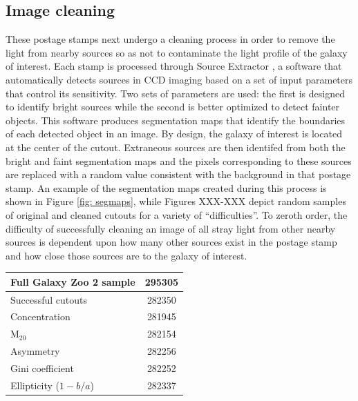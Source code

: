 \subsection{Image cleaning}
These postage stamps next undergo a cleaning process in order to remove the light from nearby sources so as not to contaminate the light profile of the galaxy of interest. Each stamp is processed through Source Extractor \citep[ver. 2.8.6;][]{sextractor}, a software that automatically detects sources in CCD imaging based on a set of input parameters that control its sensitivity. Two sets of parameters are used: the first is designed to identify bright sources while the second is better optimized to detect fainter objects. This software produces segmentation maps that identify the boundaries of each detected object in an image. By design, the galaxy of interest is located at the center of the cutout. Extraneous sources are then identifed from both the bright and faint segmentation maps and the pixels corresponding to these sources are replaced with a random value consistent with the background in that postage stamp.  An example of the segmentation maps created during this process is shown in Figure \ref{fig: segmaps}, while Figures XXX-XXX depict random samples of original and cleaned cutouts for a variety of ``difficulties''. To zeroth order, the difficulty of successfully cleaning an image of all stray light from other nearby sources is dependent upon how many other sources exist in the postage stamp and how close those sources are to the galaxy of interest. 


\begin{table}
	\begin{tabular}{|l|c|}
		\hline
		Full Galaxy Zoo 2 sample 	& 295305 \\
		\hline
		\hline
		Successful cutouts 			& 282350 \\
		Concentration				& 281945 \\
		M$_{20}$					& 282154 \\
		Asymmetry 					& 282256 \\
		Gini coefficient			& 282252 \\
		Ellipticity ($1 - b/a$)		& 282337 \\
		\hline
	\end{tabular}
\end{table}


